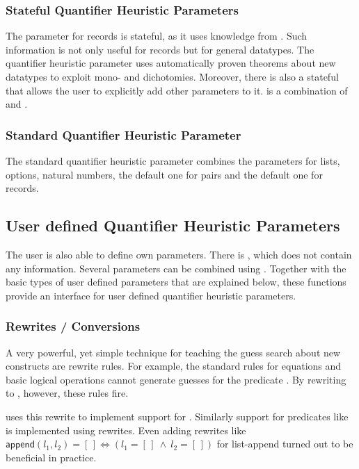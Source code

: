 \subsubsection{Stateful Quantifier Heuristic Parameters}

The parameter for records is stateful, as it uses knowledge from
. Such information is not only useful for records
but for general datatypes. The quantifier heuristic parameter
 uses automatically proven theorems about new
datatypes to exploit mono- and dichotomies. Moreover, there is also a
stateful  that allows the user to
explicitly add other parameters to it.   is a
combination of  and .

\subsubsection{Standard Quantifier Heuristic Parameter}

The standard quantifier heuristic parameter  combines
the parameters for lists, options, natural numbers, the default one
for pairs and the default one for records.


\subsection{User defined Quantifier Heuristic Parameters}\label{sec:qps-user}

The user is also able to define own parameters. There
is , which does not contain any information. Several
parameters can be combined using
. Together with the basic types of user defined
parameters that are explained below, these functions provide an
interface for user defined quantifier heuristic parameters.

\subsubsection{Rewrites / Conversions}

A very powerful, yet simple technique for teaching the guess search
about new constructs are rewrite rules. For example, the standard rules
for equations and basic logical operations
cannot generate guesses for the predicate . By
rewriting  to , however, these rules fire.

 uses this rewrite to implement support for
. Similarly support for predicates like  is
implemented using rewrites. Even adding
rewrites like $\textsf{append}(l_1, l_2) = [\,] \Longleftrightarrow (l_1 =
[\,]\ \wedge\ l_2 = [\,])$ for list-append turned out to be beneficial
in practice.
\bigskip

